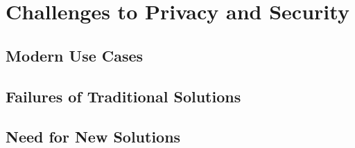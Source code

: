 %
\chapter{Challenges to Privacy and Security}
\label{chap:challenges}

\section{Modern Use Cases}
\section{Failures of Traditional Solutions}
\section{Need for New Solutions}
